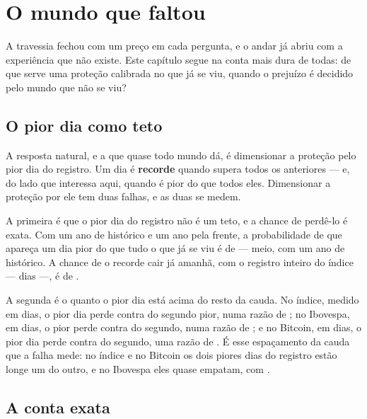 \chapter{O mundo que faltou}\label{cap:faltou}

A travessia fechou com um preço em cada pergunta, e o andar já abriu com a experiência que não
existe. Este capítulo segue na conta mais dura de todas: de que serve uma proteção calibrada no
que já se viu, quando o prejuízo é decidido pelo mundo que não se viu?

\section{O pior dia como teto}

A resposta natural, e a que quase todo mundo dá, é dimensionar a proteção pelo pior dia do registro.
Um dia é \textbf{recorde} quando supera todos os anteriores --- e, do lado que interessa aqui,
quando é pior do que todos eles. Dimensionar a proteção por ele tem duas falhas, e as duas se
medem.

A primeira é que o pior dia do registro não é um teto, e a chance
de perdê-lo é exata. Com um ano de
histórico e um ano pela frente, a probabilidade de que apareça um dia pior do que tudo o que já se
viu é de \numRecordeProbabilidade{} --- meio, com um ano de histórico. A chance de o recorde cair já
amanhã, com o registro inteiro do índice --- \numRecordeIndiceDias{} dias ---, é de
\numRecordeDoProximo{}.

A segunda é o quanto o pior dia está acima do resto da cauda. No índice, medido em \numRecordeIndiceDias{} dias, o pior dia perde \numRecordeIndicePior{} contra
\numRecordeIndiceSegundo{} do segundo pior, numa razão de \numRecordeIndiceRazao{}; no Ibovespa, em
\numRecordeIbovespaDias{} dias, o pior perde \numRecordeIbovespaPior{} contra
\numRecordeIbovespaSegundo{} do segundo, numa razão de \numRecordeIbovespaRazao{}; e no Bitcoin, em
\numRecordeBitcoinDias{} dias, o pior dia perde \numRecordeBitcoinPior{} contra
\numRecordeBitcoinSegundo{} do segundo, uma razão de \numRecordeBitcoinRazao{}. É esse espaçamento da cauda que a falha mede: no
índice e no Bitcoin os dois piores dias do registro estão longe um do outro, e no Ibovespa eles quase
empatam, com \numRecordeIbovespaRazao{}.

\section{A conta exata}

